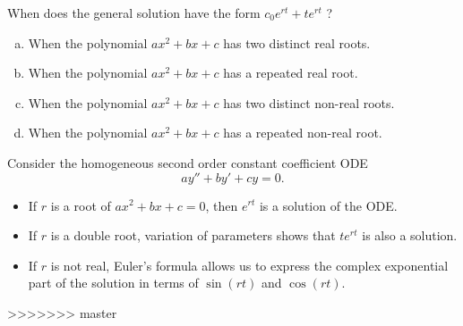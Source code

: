 \begin{applicationActivities}
\begin{activity}{5}
When does the general solution have the form \(c_0 e^{rt}+te^{rt}\) ?
\begin{enumerate}[(a)]
\item When the polynomial \(ax^2+bx+c\) has two distinct real roots.
\item When the polynomial \(ax^2+bx+c\) has a repeated real root.
\item When the polynomial \(ax^2+bx+c\) has two distinct non-real roots.
\item When the polynomial \(ax^2+bx+c\) has a repeated non-real root.
\end{enumerate}
\end{activity}


\begin{observation}
Consider the homogeneous second order constant coefficient ODE \[ay''+by'+cy=0.\]
\vfill
\begin{itemize}
\item If \(r\) is a root of \(ax^2+bx+c=0\), then \(e^{rt}\) is a solution of the ODE.
\item If \(r\) is a double root, variation of parameters shows that \(te^{rt}\) is also a solution.
\item If \(r\) is not real, Euler's formula allows us to express the complex exponential part of the solution in terms of \(\sin(rt)\) and \(\cos(rt)\).
\end{itemize}
\end{observation}
>>>>>>> master



\end{applicationActivities}
